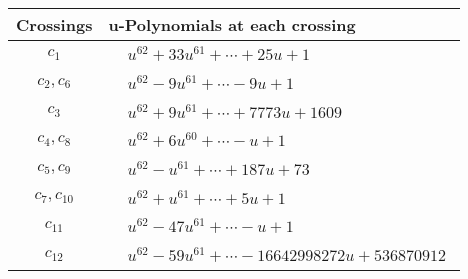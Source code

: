 \documentclass[1p]{elsarticle_modified}
\theoremstyle{definition}
\begin{document}
\begin{tabular}{m{50pt}|m{274pt}}
Crossings & \hspace{64pt}u-Polynomials at each crossing \\
\hline $$\begin{aligned}c_{1}\end{aligned}$$&$\begin{aligned}
&u^{62}+33 u^{61}+\cdots+25 u+1
\end{aligned}$\\
\hline $$\begin{aligned}c_{2},c_{6}\end{aligned}$$&$\begin{aligned}
&u^{62}-9 u^{61}+\cdots-9 u+1
\end{aligned}$\\
\hline $$\begin{aligned}c_{3}\end{aligned}$$&$\begin{aligned}
&u^{62}+9 u^{61}+\cdots+7773 u+1609
\end{aligned}$\\
\hline $$\begin{aligned}c_{4},c_{8}\end{aligned}$$&$\begin{aligned}
&u^{62}+6 u^{60}+\cdots- u+1
\end{aligned}$\\
\hline $$\begin{aligned}c_{5},c_{9}\end{aligned}$$&$\begin{aligned}
&u^{62}- u^{61}+\cdots+187 u+73
\end{aligned}$\\
\hline $$\begin{aligned}c_{7},c_{10}\end{aligned}$$&$\begin{aligned}
&u^{62}+u^{61}+\cdots+5 u+1
\end{aligned}$\\
\hline $$\begin{aligned}c_{11}\end{aligned}$$&$\begin{aligned}
&u^{62}-47 u^{61}+\cdots- u+1
\end{aligned}$\\
\hline $$\begin{aligned}c_{12}\end{aligned}$$&$\begin{aligned}
&u^{62}-59 u^{61}+\cdots-16642998272 u+536870912
\end{aligned}$\\
\hline
\end{tabular}\\~\\
\end{document}
